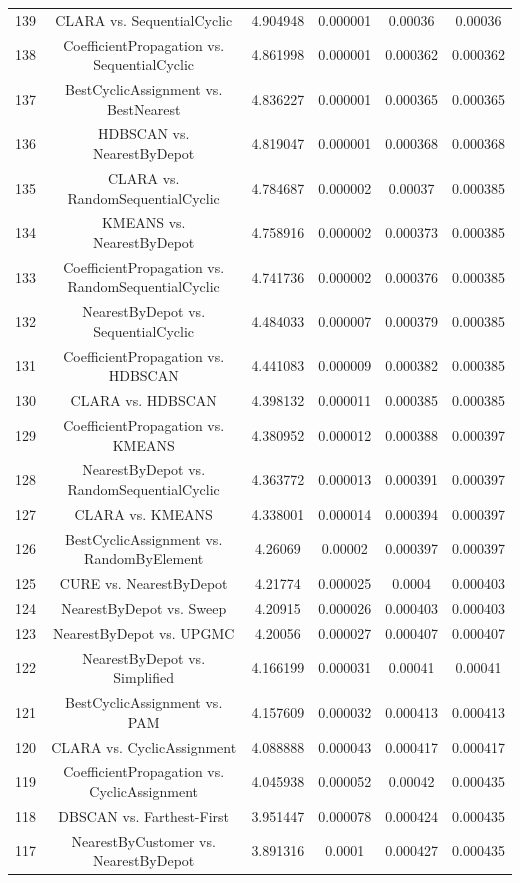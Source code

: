\documentclass[a4paper,10pt]{article}
\begin{document}
\begin{landscape}
\begin{table}[!htp]
\begin{tabular}{cccccc}
139&CLARA vs. SequentialCyclic&4.904948&0.000001&0.00036&0.00036\\
138&CoefficientPropagation vs. SequentialCyclic&4.861998&0.000001&0.000362&0.000362\\
137&BestCyclicAssignment vs. BestNearest&4.836227&0.000001&0.000365&0.000365\\
136&HDBSCAN vs. NearestByDepot&4.819047&0.000001&0.000368&0.000368\\
135&CLARA vs. RandomSequentialCyclic&4.784687&0.000002&0.00037&0.000385\\
134&KMEANS vs. NearestByDepot&4.758916&0.000002&0.000373&0.000385\\
133&CoefficientPropagation vs. RandomSequentialCyclic&4.741736&0.000002&0.000376&0.000385\\
132&NearestByDepot vs. SequentialCyclic&4.484033&0.000007&0.000379&0.000385\\
131&CoefficientPropagation vs. HDBSCAN&4.441083&0.000009&0.000382&0.000385\\
130&CLARA vs. HDBSCAN&4.398132&0.000011&0.000385&0.000385\\
129&CoefficientPropagation vs. KMEANS&4.380952&0.000012&0.000388&0.000397\\
128&NearestByDepot vs. RandomSequentialCyclic&4.363772&0.000013&0.000391&0.000397\\
127&CLARA vs. KMEANS&4.338001&0.000014&0.000394&0.000397\\
126&BestCyclicAssignment vs. RandomByElement&4.26069&0.00002&0.000397&0.000397\\
125&CURE vs. NearestByDepot&4.21774&0.000025&0.0004&0.000403\\
124&NearestByDepot vs. Sweep&4.20915&0.000026&0.000403&0.000403\\
123&NearestByDepot vs. UPGMC&4.20056&0.000027&0.000407&0.000407\\
122&NearestByDepot vs. Simplified&4.166199&0.000031&0.00041&0.00041\\
121&BestCyclicAssignment vs. PAM&4.157609&0.000032&0.000413&0.000413\\
120&CLARA vs. CyclicAssignment&4.088888&0.000043&0.000417&0.000417\\
119&CoefficientPropagation vs. CyclicAssignment&4.045938&0.000052&0.00042&0.000435\\
118&DBSCAN vs. Farthest-First&3.951447&0.000078&0.000424&0.000435\\
117&NearestByCustomer vs. NearestByDepot&3.891316&0.0001&0.000427&0.000435\\

\end{tabular}
\end{table}
\end{landscape}
\end{document}

